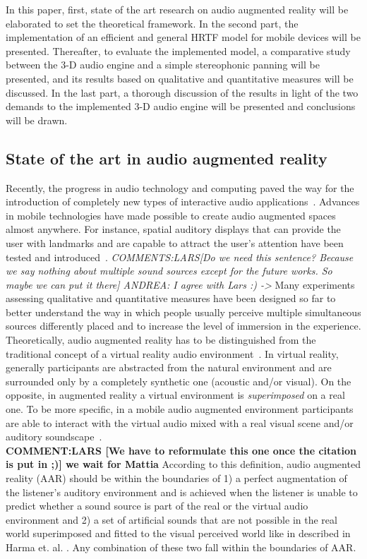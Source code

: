 \documentclass[journal]{IEEEtran}
\begin{document}
In this paper, first, state of the art research on audio augmented reality will be elaborated to set the theoretical framework. In the second part, the implementation of an efficient and general HRTF model for mobile devices will be presented. Thereafter, to evaluate the implemented model, a comparative study between the 3-D audio engine and a simple stereophonic panning will be presented, and its results based on qualitative and quantitative measures will be discussed. In the last part, a thorough discussion of the results in light of the two demands to the implemented 3-D audio engine will be presented and conclusions will be drawn.

\subsection{State of the art in audio augmented reality}
Recently, the progress in audio technology and computing paved the way for the introduction of completely new types of interactive audio applications~\cite{harma2004}. Advances in mobile technologies have made possible to create audio augmented spaces almost anywhere. For instance, spatial auditory displays that can provide the user with landmarks and are capable to attract the user's attention have been tested and introduced~\cite{alvarez2011}. \emph{COMMENTS:LARS[Do we need this sentence? Because we say nothing about multiple sound sources except for the future works. So maybe we can put it there] ANDREA: I agree with Lars :) ->} Many experiments assessing qualitative and quantitative measures have been designed so far to better understand the way in which people usually perceive multiple simultaneous sources differently placed and to increase the level of immersion in the experience.\\

Theoretically, audio augmented reality has to be distinguished from the traditional concept of a virtual reality audio environment~\cite{harma2004}. In virtual reality, generally participants are abstracted from the natural environment and are surrounded only by a completely synthetic one (acoustic and/or visual). On the opposite, in augmented reality a virtual environment is \emph{superimposed} on a real one. To be more specific, in a mobile audio augmented environment participants are able to interact with the virtual audio mixed with a real visual scene and/or auditory soundscape~\cite{alvarez2011}.\\

\textbf{COMMENT:LARS [We have to reformulate this one once the citation is put in ;)] we wait for Mattia} According to this definition, audio augmented reality (AAR) should be within the boundaries of 1) a perfect augmentation of the listener's auditory environment and is achieved when the listener is unable to predict whether a sound source is part of the real or the virtual audio environment and 2) a set of artificial sounds that are not possible in the real world superimposed and fitted to the visual perceived world like in described in Harma et. al. \cite{harma2004}. Any combination of these two fall within the boundaries of AAR.\\
\end{document}
